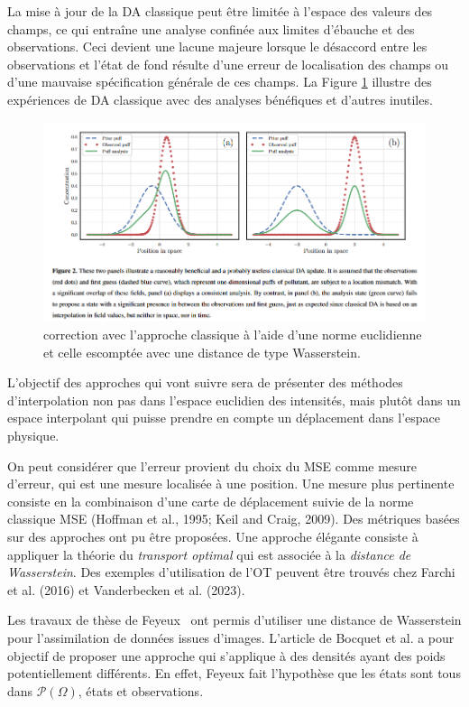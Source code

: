 \documentclass{article}
\begin{document}
La mise à jour de la DA classique peut être limitée à l'espace des valeurs des champs, ce qui entraîne une analyse confinée aux limites d'ébauche et des observations. Ceci devient une lacune majeure lorsque le désaccord entre les observations et l'état de fond résulte d'une erreur de localisation des champs ou d'une mauvaise spécification générale de ces champs. La Figure \ref{fig:prior_field} illustre des expériences de DA classique avec des analyses bénéfiques et d'autres inutiles.

\begin{figure}[h]
    \centering
    \includegraphics[width=\linewidth]{prior_field.png}
    \caption{correction avec l'approche classique à l'aide d'une norme euclidienne et celle escomptée avec une distance de type Wasserstein.}
    \label{fig:prior_field}
\end{figure}

L'objectif des approches qui vont suivre sera de présenter des méthodes d'interpolation non pas dans l'espace euclidien des intensités, mais plutôt dans un espace interpolant qui puisse prendre en compte un déplacement dans l'espace physique.

On peut considérer que l'erreur provient du choix du MSE comme mesure d'erreur, qui est une mesure localisée à une position. Une mesure plus pertinente consiste en la combinaison d'une carte de déplacement suivie de la norme classique MSE (Hoffman et al., 1995; Keil and Craig, 2009). Des métriques basées sur des approches ont pu être proposées.
Une approche élégante consiste à appliquer la théorie du \textit{transport optimal} qui est associée à la \textit{distance de Wasserstein}. Des exemples d'utilisation de l'OT peuvent être trouvés chez Farchi et al. (2016) et Vanderbecken et al. (2023).

Les travaux de thèse de Feyeux~\cite{feyeux_transport_nodate} ont permis d'utiliser une distance de Wasserstein pour l'assimilation de données issues d'images. L'article de Bocquet et al. \cite{bocquet_bridging_2023} a pour objectif de proposer une approche qui s'applique à des densités ayant des poids potentiellement différents. En effet, Feyeux fait l'hypothèse que les états sont tous dans $\mathcal P(\Omega)$, états et observations.
\end{document}
